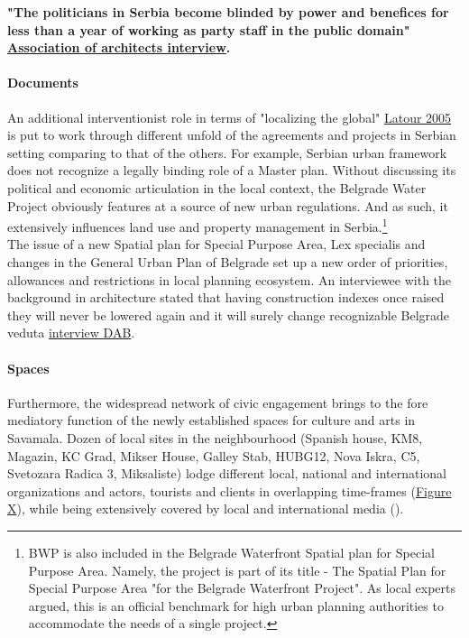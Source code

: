 \documentclass[11pt]{report}
\begin{document}
\textbf{"The politicians in Serbia become blinded by power and benefices for less than a year of working as party staff in the public domain" \href{}{Association of architects interview}.}

\paragraph{Documents}

An additional interventionist role in terms of "localizing the global" \href{}{Latour 2005} is put to work through different unfold of the agreements and projects in Serbian setting comparing to that of the others.
For example, Serbian urban framework does not recognize a legally binding role of a Master plan. Without discussing its political and economic articulation in the local context, the Belgrade Water Project obviously features at a source of new urban regulations.
And as such, it extensively influences land use and property management in Serbia.\footnote
{BWP is also included in the Belgrade Waterfront Spatial plan for Special Purpose Area.
Namely, the project is part of its title - The Spatial Plan for Special Purpose Area "for the Belgrade Waterfront Project". As local experts argued, this is an official benchmark for high urban planning authorities to accommodate the needs of a single project.}
\\
The issue of a new Spatial plan for Special Purpose Area, Lex specialis and changes in the General Urban Plan of Belgrade set up a new order of priorities, allowances and restrictions in local planning ecosystem. An interviewee with the background in architecture stated that having construction indexes once raised they will never be lowered again and it will surely change recognizable Belgrade veduta \href{}{interview DAB}.

\paragraph{Spaces}

Furthermore, the widespread network of civic engagement brings to the fore mediatory function of the newly established spaces for culture and arts in Savamala.
Dozen of local sites in the neighbourhood
(Spanish house, KM8, Magazin, KC Grad, Mikser House, Galley Stab, HUBG12, Nova Iskra, C5, Svetozara Radica 3, Miksaliste) lodge different local, national and international organizations and actors, tourists and clients in overlapping time-frames (\href{}{Figure X}),
while being extensively covered by local and international media
(\cite{add references from media sources archive}).
\end{document}
